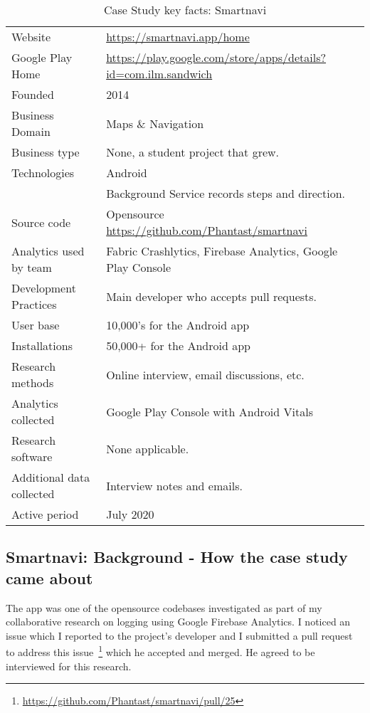 {\renewcommand{\arraystretch}{0.8}%
\begin{table*}
    \centering
    \small
    \setlength{\tabcolsep}{6pt}
    \begin{tabular}{lp{9cm}}
       \toprule
       Website &\url{https://smartnavi.app/home} \\
       Google Play Home & \url{https://play.google.com/store/apps/details?id=com.ilm.sandwich} \\
       Founded & 2014 \\
       Business Domain & Maps \& Navigation \\
       Business type & None, a student project that grew. \\
       Technologies  & Android \\
       & Background Service records steps and direction. \\
       Source code  & Opensource \url{https://github.com/Phantast/smartnavi} \\
       Analytics used by team & Fabric Crashlytics, Firebase Analytics, Google Play Console \\
       Development Practices & Main developer who accepts pull requests. \\
       \midrule
       User base & 10,000's for the Android app \\
       Installations & 50,000+ for the Android app \\
       \midrule
       Research methods &Online interview, email discussions, etc. \\
       Analytics collected &Google Play Console with Android Vitals \\
       Research software & None applicable. \\
       Additional data collected &Interview notes and emails. \\
       Active period & July 2020 \\
       \bottomrule
    \end{tabular}
    \caption{Case Study key facts: Smartnavi}
    \label{tab:smartnavi_anaytics_overview}
\end{table*}
}

\subsection{Smartnavi: Background - How the case study came about}
The app was one of the opensource codebases investigated as part of my collaborative research on logging using Google Firebase Analytics. I noticed an issue which I reported to the project's developer and I submitted a pull request to address this issue~\footnote{\url{https://github.com/Phantast/smartnavi/pull/25}} which he accepted and merged. He agreed to be interviewed for this research.


